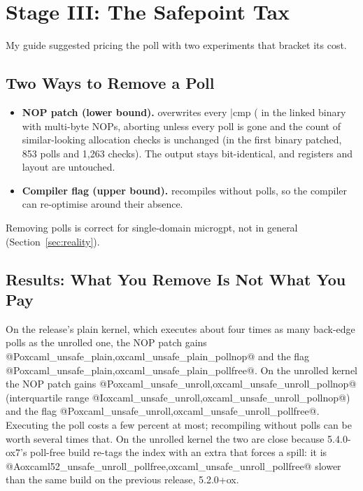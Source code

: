 \section{Stage III: The Safepoint Tax}
\label{sec:polls}

My guide suggested pricing the poll with two experiments that bracket its cost.

\subsection{Two Ways to Remove a Poll}
\begin{itemize}
  \item \textbf{NOP patch (lower bound).} 
        overwrites every \ainl|cmp (%
        in the linked binary with multi-byte NOPs, aborting unless every poll
        is gone and the count of similar-looking allocation checks is
        unchanged (in the first binary patched, 853 polls and 1,263 checks).
        The output stays bit-identical, and registers and layout are
        untouched.
  \item \textbf{Compiler flag (upper bound).} 
        recompiles without polls, so the compiler can re-optimise around
        their absence.
\end{itemize}

Removing polls is correct for single-domain microgpt, not in general
(Section~\ref{sec:reality}).

\subsection{Results: What You Remove Is Not What You Pay}
\label{fig:polls}
On the release's plain kernel, which executes about four times as many
back-edge polls as the unrolled one, the NOP patch gains
@P{oxcaml_unsafe_plain,oxcaml_unsafe_plain_pollnop}@ and the flag
@P{oxcaml_unsafe_plain,oxcaml_unsafe_plain_pollfree}@. On the unrolled kernel
the NOP patch gains @P{oxcaml_unsafe_unroll,oxcaml_unsafe_unroll_pollnop}@
(interquartile range @I{oxcaml_unsafe_unroll,oxcaml_unsafe_unroll_pollnop}@)
and the flag @P{oxcaml_unsafe_unroll,oxcaml_unsafe_unroll_pollfree}@.
Executing the poll costs a few percent at most; recompiling without polls can
be worth several times that. On the unrolled kernel the two are close because
5.4.0-ox7's poll-free build re-tags the index with an extra  that
forces a spill: it is @A{oxcaml52_unsafe_unroll_pollfree,oxcaml_unsafe_unroll_pollfree}@
slower than the same build on the previous release, 5.2.0+ox.

